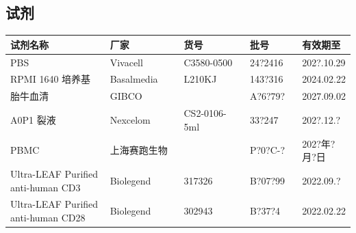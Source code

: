 \documentclass[UTF8,10pt,a4paper,fontset=fandol]{ctexart}
\newcommand{\fieldvalue}[1]{#1}
\newcommand{\handwritten}[1]{#1}
\begin{document}
\subsection{试剂}

\begin{tabular}{|p{0.31\linewidth}|p{0.22\linewidth}|p{0.20\linewidth}|p{0.16\linewidth}|p{0.16\linewidth}|}
\hline
试剂名称 & 厂家 & 货号 & 批号 & 有效期至\\
\hline
PBS & Vivacell & C3580-0500 &
\fieldvalue{\handwritten{24?2416}} &
\fieldvalue{\handwritten{202?.10.29}}\\
\hline
RPMI 1640 培养基 & Basalmedia & L210KJ &
\fieldvalue{\handwritten{143?316}} &
\fieldvalue{\handwritten{2024.02.22}}\\
\hline
胎牛血清 & GIBCO & &
\fieldvalue{\handwritten{A?6?79?}} &
\fieldvalue{\handwritten{2027.09.02}}\\
\hline
A0P1 裂液 & Nexcelom & CS2-0106-5ml &
\fieldvalue{\handwritten{33?247}} &
\fieldvalue{\handwritten{202?.12.?}}\\
\hline
PBMC & 上海赛跑生物 & &
\fieldvalue{\handwritten{P?0?C-?}} &
\fieldvalue{\handwritten{202?年?月?日}}\\
\hline
Ultra-LEAF Purified anti-human CD3 & Biolegend & 317326 &
\fieldvalue{\handwritten{B?07?99}} &
\fieldvalue{\handwritten{2022.09.?}}\\
\hline
Ultra-LEAF Purified anti-human CD28 & Biolegend & 302943 &
\fieldvalue{\handwritten{B?37?4}} &
\fieldvalue{\handwritten{2022.02.22}}\\
\hline
\end{tabular}
\end{document}
